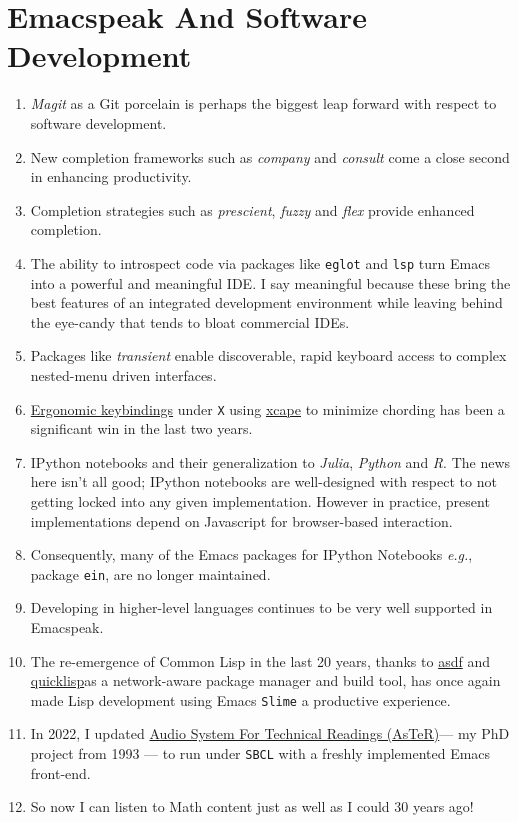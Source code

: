 \documentclass[11pt]{article}
\begin{document}
\section{Emacspeak And Software Development}
\label{sec:org25a9248}

\begin{enumerate}
\item \emph{Magit}  as a Git porcelain is perhaps the biggest leap forward
with respect to software development.
\item New completion frameworks such as \emph{company} and \emph{consult} come a
close second in enhancing productivity.
\item Completion strategies such as \emph{prescient}, \emph{fuzzy} and
\emph{flex} provide  enhanced completion.
\item The ability to introspect code via packages like \texttt{eglot} and
\texttt{lsp} turn Emacs into a powerful and meaningful IDE. I say
meaningful because these bring the best features of an integrated
development environment while leaving behind the eye-candy that
tends to bloat commercial IDEs.
\item Packages like \emph{transient}  enable discoverable, rapid keyboard access to
complex nested-menu driven interfaces.
\item \href{https://emacspeak.blogspot.com/2023/09/emacs-ergonomics-dont-punish-your.html}{Ergonomic keybindings} under \texttt{X} using \href{https://github.com/alols/xcape}{xcape} to minimize
chording has been  a significant win in the last two years.
\item IPython notebooks and their generalization to \emph{Julia}, \emph{Python}
and \emph{R}. The news here isn't all good; IPython notebooks are
well-designed with respect to not getting locked into any given
implementation. However in practice, present implementations
depend on Javascript for browser-based interaction.
\item Consequently, many of the Emacs  packages  for IPython
Notebooks \emph{e.g.}, package \texttt{ein},  are no longer maintained.
\item Developing in higher-level languages continues to be very well
supported in Emacspeak.
\item The re-emergence of Common Lisp in the last 20 years, thanks to
\href{https://asdf.common-lisp.dev/asdf.html}{asdf}  and \href{https://www.quicklisp.org/}{quicklisp}as a network-aware package manager and build tool, has
once again made Lisp development using Emacs \texttt{Slime} a productive
experience.
\item In 2022, I updated \href{https://emacspeak.blogspot.com/2022/12/aster-spoken-math-on-emacspeak-audio\_21.html}{Audio System For Technical
Readings (AsTeR)}--- my PhD project from 1993 --- to run under \texttt{SBCL}
with a freshly implemented Emacs front-end.
\item So now I can listen to Math content just as well as I could 30
years ago!
\end{enumerate}
\end{document}
